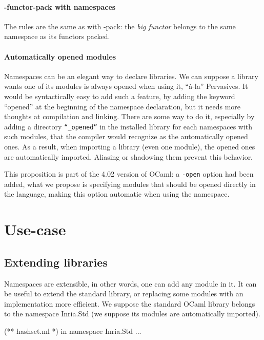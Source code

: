 \documentclass[11pt,a4paper]{article}
\begin{document}
\paragraph{-functor-pack with namespaces}

The rules are the same as with -pack: the \emph{big functor} belongs to the same
namespace as its functors packed.

\paragraph{Automatically opened modules}

Namespaces can be an elegant way to declare libraries. We can suppose a library
wants one of its modules is always opened when using it, ``à-la'' Pervasives. It
would be syntactically easy to add such a feature, by adding the keyword
``opened'' at the beginning of the namespace declaration, but it needs more
thoughts at compilation and linking. There are some way to do it, especially by
adding a directory \texttt{``\_opened''} in the installed library for each
namespaces with such modules, that the compiler would recognize as the
automatically opened ones. As a result, when importing a library (even one
module), the opened ones are automatically imported. Aliasing or shadowing
them prevent this behavior.

This proposition is part of the 4.02 version of OCaml: a \texttt{-open} option
had been added, what we propose is specifying modules that should be opened
directly in the language, making this option automatic when using the namespace.

\section{Use-case}

\subsection{Extending libraries}

Namespaces are extensible, in other words, one can add any module in it. It can
be useful to extend the standard library, or replacing some modules with an
implementation more efficient. We suppose the standard OCaml library belongs to
the namespace Inria.Std (we suppose its modules are automatically
imported).

\begin{OCaml}
(** hashset.ml *)
in namespace Inria.Std
...
\end{OCaml}
\end{document}
